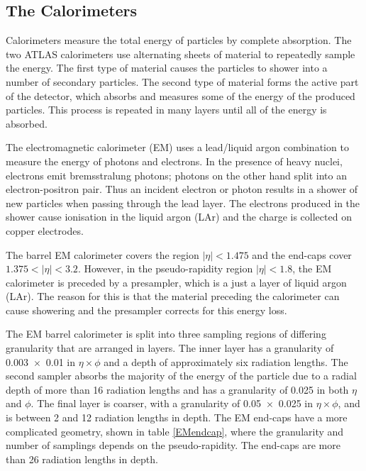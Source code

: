\subsection{The Calorimeters}

Calorimeters measure the total energy of particles by complete absorption. The two ATLAS calorimeters \cite{:1999fq:Chapter1,:1999fq:Chapter4,:1999fq:Chapter5} use alternating sheets of material to repeatedly sample the energy. The first type of material causes the particles to shower into a number of secondary particles. The second type of material forms the active part of the detector, which absorbs and measures some of the energy of the produced particles. This process is repeated in many layers until all of the energy is absorbed. 

The electromagnetic calorimeter (EM) uses a lead/liquid argon combination to measure the energy of photons and electrons. In the presence of heavy nuclei, electrons emit bremsstralung photons; photons on the other hand split into an electron-positron pair. Thus an incident electron or photon results in a shower of new particles when passing through the lead layer.
The electrons produced in the shower cause ionisation in the liquid argon (LAr) and the charge is collected on copper electrodes.

The barrel EM calorimeter covers the region $|\eta|<1.475$ and the end-caps cover $1.375 < |\eta| < 3.2$. However, in the pseudo-rapidity region $|\eta| < 1.8$, the EM calorimeter is preceded by a presampler, which is a just a layer of liquid argon (LAr). The reason for this is that the material preceding the calorimeter can cause showering and the presampler corrects for this energy loss. 

The EM barrel calorimeter is split into three sampling regions of differing granularity that are arranged in layers. The inner layer has a granularity of 0.003~$\times$~0.01 in $\eta\times\phi$ and a depth of
approximately six radiation lengths.
The second sampler absorbs the majority of the energy of the particle due to a radial depth of more than 16 radiation lengths and has a granularity of 0.025 in both $\eta$ and $\phi$. The final layer is coarser, with a granularity of 0.05~$\times$~0.025 in $\eta\times\phi$, and is between 2 and 12 radiation lengths in depth. The EM end-caps have a more complicated geometry, shown in table \ref{EMendcap}, where the granularity and number of samplings depends on the pseudo-rapidity. The end-caps are more than 26 radiation lengths in depth.


